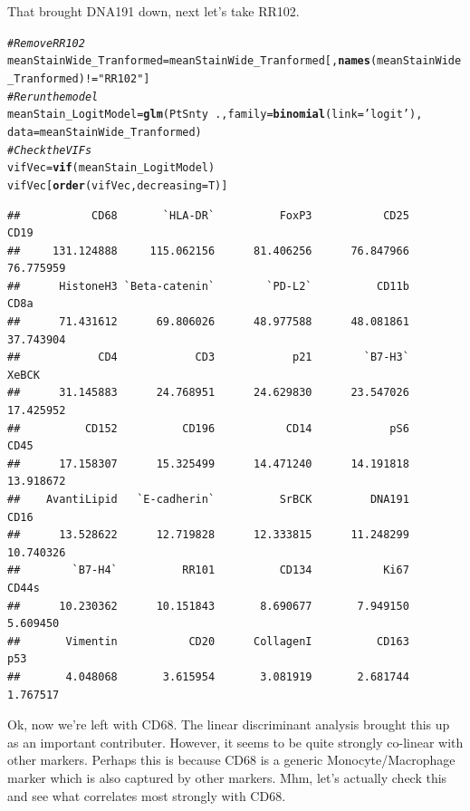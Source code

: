\documentclass[a4paper]{article}\usepackage[]{graphicx}\usepackage[]{color}
\makeatletter
\newcommand{\hlstr}[1]{\textcolor[rgb]{0.192,0.494,0.8}{#1}}%
\newcommand{\hlcom}[1]{\textcolor[rgb]{0.678,0.584,0.686}{\textit{#1}}}%
\newcommand{\hlopt}[1]{\textcolor[rgb]{0,0,0}{#1}}%
\newcommand{\hlstd}[1]{\textcolor[rgb]{0.345,0.345,0.345}{#1}}%
\newcommand{\hlkwb}[1]{\textcolor[rgb]{0.69,0.353,0.396}{#1}}%
\newcommand{\hlkwc}[1]{\textcolor[rgb]{0.333,0.667,0.333}{#1}}%
\newcommand{\hlkwd}[1]{\textcolor[rgb]{0.737,0.353,0.396}{\textbf{#1}}}%
\newenvironment{kframe}{%
 \def\at@end@of@kframe{}%
 \ifinner\ifhmode%
  \def\at@end@of@kframe{\end{minipage}}%
  \begin{minipage}{\columnwidth}%
 \fi\fi%
 \def\FrameCommand##1{\hskip\@totalleftmargin \hskip-\fboxsep
 \colorbox{shadecolor}{##1}\hskip-\fboxsep
     \hskip-\linewidth \hskip-\@totalleftmargin \hskip\columnwidth}%
 \MakeFramed {\advance\hsize-\width
   \@totalleftmargin\z@ \linewidth\hsize
   \@setminipage}}%
 {\par\unskip\endMakeFramed%
 \at@end@of@kframe}
\newenvironment{knitrout}{}{} %
\makeatother
\begin{document}
That brought DNA191 down, next let's take RR102.
\begin{knitrout}
\color{fgcolor}\begin{kframe}
\begin{alltt}
\hlcom{# Remove RR102}
\hlstd{meanStainWide_Tranformed} \hlkwb{=} \hlstd{meanStainWide_Tranformed[,}\hlkwd{names}\hlstd{(meanStainWide_Tranformed)}\hlopt{!=}\hlstr{"RR102"}\hlstd{]}
\hlcom{# Rerun the model}
\hlstd{meanStain_LogitModel} \hlkwb{=} \hlkwd{glm}\hlstd{(PtSnty} \hlopt{~}\hlstd{.,}\hlkwc{family}\hlstd{=}\hlkwd{binomial}\hlstd{(}\hlkwc{link}\hlstd{=}\hlstr{'logit'}\hlstd{),}
                           \hlkwc{data}\hlstd{=meanStainWide_Tranformed)}
\hlcom{# Check the VIFs}
\hlstd{vifVec} \hlkwb{=} \hlkwd{vif}\hlstd{(meanStain_LogitModel)}
\hlstd{vifVec[}\hlkwd{order}\hlstd{(vifVec,}\hlkwc{decreasing}\hlstd{=T)]}
\end{alltt}
\begin{verbatim}
##           CD68       `HLA-DR`          FoxP3           CD25           CD19 
##     131.124888     115.062156      81.406256      76.847966      76.775959 
##      HistoneH3 `Beta-catenin`        `PD-L2`          CD11b           CD8a 
##      71.431612      69.806026      48.977588      48.081861      37.743904 
##            CD4            CD3            p21        `B7-H3`          XeBCK 
##      31.145883      24.768951      24.629830      23.547026      17.425952 
##          CD152          CD196           CD14            pS6           CD45 
##      17.158307      15.325499      14.471240      14.191818      13.918672 
##    AvantiLipid   `E-cadherin`          SrBCK         DNA191           CD16 
##      13.528622      12.719828      12.333815      11.248299      10.740326 
##        `B7-H4`          RR101          CD134           Ki67          CD44s 
##      10.230362      10.151843       8.690677       7.949150       5.609450 
##       Vimentin           CD20      CollagenI          CD163            p53 
##       4.048068       3.615954       3.081919       2.681744       1.767517
\end{verbatim}
\end{kframe}
\end{knitrout}

Ok, now we're left with CD68. The linear discriminant analysis brought this up as an important contributer. However, it seems to be quite strongly co-linear with other markers. Perhaps this is because CD68 is a generic Monocyte/Macrophage marker which is also captured by other markers. Mhm, let's actually check this and see what correlates most strongly with CD68.
\end{document}
